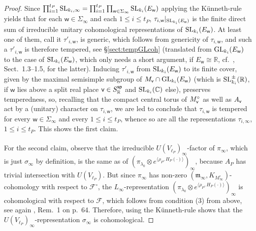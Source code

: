 \documentclass[a4paper,10pt]{amsart}
\theoremstyle{definition}
\numberwithin{equation}{section}
\def\R{\mathbb R}
\def\C{\mathbb C}
\def\cF{\mathcal F}
\def\m{\mathfrak m}
\def\ww{\mathsf w}
\def\vv{{\sf v}} %
\begin{document}
\begin{proof}
Since $\prod_{i=1}^{t_P}{\rm SL}_{k_i,\infty}=\prod_{i=1}^{t_P}\prod_{\ww\in\Sigma_\infty} {\rm SL}_{k_i}(E_\ww)$ applying the K\"unneth-rule yields that for each $\ww\in \Sigma_\infty$ and each $1\leq i\leq t_P$, $\tau_{i,\ww}|_{{\rm SL}_{k_i}(E_\ww)}$ is the finite direct sum of irreducible unitary cohomological representations of ${\rm SL}_{k_i}(E_\ww)$. At least one of them, call it $\tau'_{i,\ww}$, is generic, which follows from genericity of $\tau_{i,\ww}$, and such a $\tau'_{i,\ww}$ is therefore tempered, see \S \ref{sect:tempGLcoh} (translated from ${\rm GL}_{k_i}(E_\ww)$ to the case of ${\rm SL}_{k_i}(E_\ww)$, which only needs a short argument, if $E_\ww\cong\R$, cf.\ \cite{speh81}, Sect.\ 1.3--1.5, for the latter). Inducing $\tau'_{i,\ww}$ from ${\rm SL}_{k_i}(E_\ww)$ to its finite cover, given by the maximal semisimple subgroup of $M_\vv\cap {\rm GL}_{k_i}(E_\ww)$ (which is ${\rm SL}^\pm_{k_i}(\R)$, if $\ww$ lies above a split real place $\vv\in S^{\sf sp}_\R$ and ${\rm SL}_{k_i}(\C)$ else), preserves temperedness, so, recalling that the compact central torus of $M^\circ_\vv$ as well as $A_\vv$ act by a (unitary) character on $\tau_{i,\ww}$, we are led to conclude that $\tau_{i,\ww}$ is tempered for every $\ww\in \Sigma_\infty$ and every $1\leq i\leq t_P$, whence so are all the representations $\tau_{i,\infty}$, $1\leq i\leq t_P$. This shows the first claim.\\\\
For the second claim, observe that the irreducible $U(V_{\ell_P})_\infty$-factor of $\pi_\infty$, which is just $\sigma_\infty$ by definition, is the same as of $(\pi_{\lambda_0}\otimes e^{\langle \rho_P,H_{P}(\cdot)\rangle})_\infty$, because $A_P$ has trivial intersection with $U(V_{\ell_P})$. But since $\pi_\infty$ has non-zero $(\m_\infty, K_{M^\circ_\infty})$-cohomology with respect to $\cF^{\circ}$, the $L_\infty$-representation $(\pi_{\lambda_0}\otimes e^{\langle \rho_P,H_{P}(\cdot)\rangle})_\infty$ is cohomological with respect to $\cF$, which follows from condition (3) from above, see again \cite{bowa}, Rem.\ 1 on p.\ 64. Therefore, using the K\"unneth-rule shows that the $U(V_{\ell_P})_\infty$-representation $\sigma_\infty$ is cohomological.
\end{proof}
\end{document}
